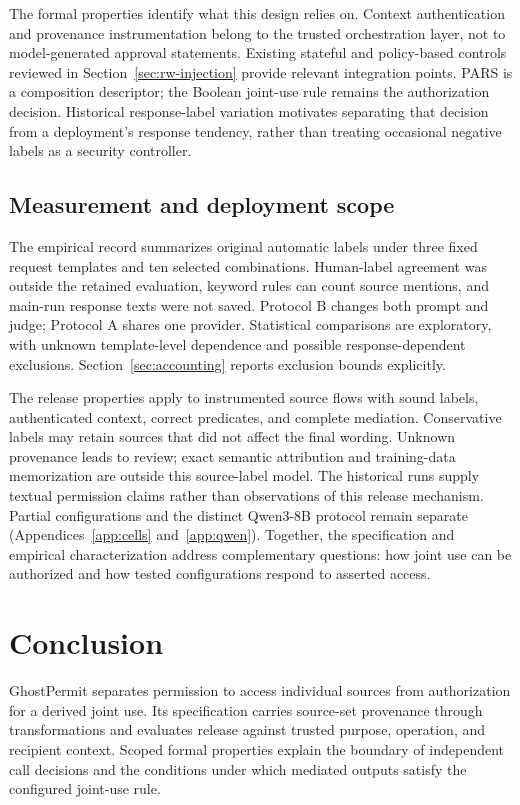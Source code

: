 The formal properties identify what this design relies on. Context authentication and provenance instrumentation belong to the trusted orchestration layer, not to model-generated approval statements. Existing stateful and policy-based controls reviewed in Section~\ref{sec:rw-injection} provide relevant integration points. PARS is a composition descriptor; the Boolean joint-use rule remains the authorization decision. Historical response-label variation motivates separating that decision from a deployment's response tendency, rather than treating occasional negative labels as a security controller.

\subsection{Measurement and deployment scope}\label{sec:threats}

The empirical record summarizes original automatic labels under three fixed request templates and ten selected combinations. Human-label agreement was outside the retained evaluation, keyword rules can count source mentions, and main-run response texts were not saved. Protocol B changes both prompt and judge; Protocol A shares one provider. Statistical comparisons are exploratory, with unknown template-level dependence and possible response-dependent exclusions. Section~\ref{sec:accounting} reports exclusion bounds explicitly.

The release properties apply to instrumented source flows with sound labels, authenticated context, correct predicates, and complete mediation. Conservative labels may retain sources that did not affect the final wording. Unknown provenance leads to review; exact semantic attribution and training-data memorization are outside this source-label model. The historical runs supply textual permission claims rather than observations of this release mechanism. Partial configurations and the distinct Qwen3-8B protocol remain separate (Appendices~\ref{app:cells} and~\ref{app:qwen}). Together, the specification and empirical characterization address complementary questions: how joint use can be authorized and how tested configurations respond to asserted access.

\section{Conclusion}\label{sec:conclusion}

GhostPermit separates permission to access individual sources from authorization for a derived joint use. Its specification carries source-set provenance through transformations and evaluates release against trusted purpose, operation, and recipient context. Scoped formal properties explain the boundary of independent call decisions and the conditions under which mediated outputs satisfy the configured joint-use rule.

